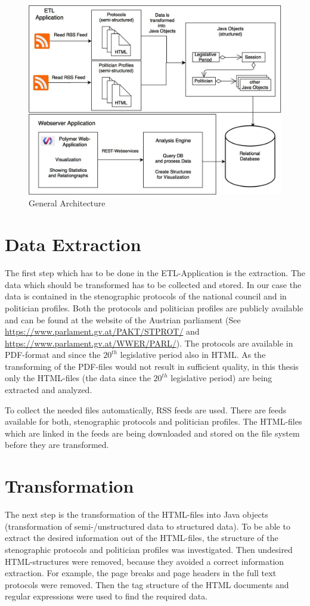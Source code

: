 \begin{figure}
	\centering
	\includegraphics[width=\textwidth]{imgs/overall_architecture}
	\caption{General Architecture}
	\label{fig:general_architecture}
\end{figure}

\section{Data Extraction}
\label{sec:data_extraction_transforming}
The first step which has to be done in the ETL-Application is the extraction. The data which should be transformed has to be collected and stored. In our case the data is contained in the stenographic protocols of the national council and in politician profiles. Both the protocols and politician profiles are publicly available and can be found at the website of the Austrian parliament (See \url{https://www.parlament.gv.at/PAKT/STPROT/} and \url{https://www.parlament.gv.at/WWER/PARL/}). The protocols are available in PDF-format and since the $20^{th}$ legislative period also in HTML. As the transforming of the PDF-files would not result in sufficient quality, in this thesis only the HTML-files (the data since the $20^{th}$ legislative period) are being extracted and analyzed.

To collect the needed files automatically, RSS feeds are used. There are feeds available for both, stenographic protocols and politician profiles. The HTML-files which are linked in the feeds are being downloaded and stored on the file system before they are transformed.

\section{Transformation}
The next step is the transformation of the HTML-files into Java objects (transformation of semi-/unstructured data to structured data). To be able to extract the desired information out of the HTML-files, the structure of the stenographic protocols and politician profiles was investigated. Then undesired HTML-structures were removed, because they avoided a correct information extraction. For example, the page breaks and page headers in the full text protocols were removed. Then the tag structure of the HTML documents and regular expressions were used to find the required data.

